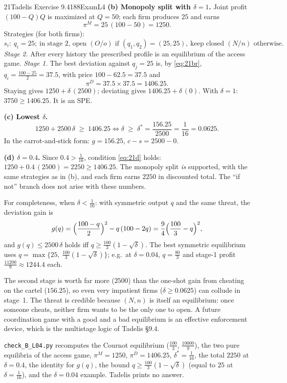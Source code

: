 \begin{exsol}{21}{Tadelis Exercise 9.4}{188}{Exam}{L4}
\textbf{(b) Monopoly split with $\delta = 1$.} Joint profit $(100 - Q)Q$ is maximized at $Q = 50$;
each firm produces $25$ and earns
\[
  \pi^M = 25\,(100 - 50) = 1250 .
\]
Strategies (for both firms):
\[
  s_i:\ q_i = 25;\ \text{in stage 2, open } (O / o) \text{ if } (q_1,q_2) = (25,25),\ \text{keep
  closed } (N / n) \text{ otherwise}.
\]
\emph{Stage 2.} After every history the prescribed profile is an equilibrium of the access game.
\emph{Stage 1.} The best deviation against $q_j = 25$ is, by \eqref{eq:21br},
$q_i = \frac{100 - 25}{2} = 37.5$, with price $100 - 62.5 = 37.5$ and
\[
  \pi^D = 37.5 \times 37.5 = 1406.25 .
\]
Staying gives $1250 + \delta\,(2500)$; deviating gives $1406.25 + \delta\,(0)$. With $\delta = 1$:
$3750 \ge 1406.25$. It is an SPE.

\textbf{(c) Lowest $\delta$.}
\begin{equation}
  1250 + 2500\,\delta \;\ge\; 1406.25 \iff \delta \;\ge\; \delta^* = \frac{156.25}{2500} = \frac{1}{16} = 0.0625 .
  \label{eq:21d}
\end{equation}
In the carrot-and-stick form: $g = 156.25$, $c - s = 2500 - 0$.

\textbf{(d) $\delta = 0.4$.} Since $0.4 > \frac1{16}$, condition \eqref{eq:21d} holds:
$1250 + 0.4\,(2500) = 2250 \ge 1406.25$. The monopoly split \emph{is} supported, with the same
strategies as in (b), and each firm earns $2250$ in discounted total. The ``if not'' branch does not
arise with these numbers.

For completeness, when $\delta < \frac1{16}$: with symmetric output $q$ and the same threat, the
deviation gain is
\[
  g(q) = \Bigl(\frac{100 - q}{2}\Bigr)^2 - q\,(100 - 2q) = \frac94\Bigl(\frac{100}{3} - q\Bigr)^2 ,
\]
and $g(q) \le 2500\,\delta$ holds iff $q \ge \frac{100}{3}(1 - \sqrt{\delta})$. The best symmetric
equilibrium uses $q = \max\{25,\ \frac{100}{3}(1 - \sqrt\delta)\}$; e.g.\ at $\delta = 0.04$,
$q = \frac{80}{3}$ and stage-1 profit $\frac{11200}{9} \approx 1244.4$ each.

\interp The second stage is worth far more ($2500$) than the one-shot gain from cheating on the
cartel ($156.25$), so even very impatient firms ($\delta \ge 0.0625$) can collude in stage~1. The
threat is credible because $(N,n)$ is itself an equilibrium: once someone cheats, neither firm
wants to be the only one to open. A future coordination game with a good and a bad equilibrium is
an effective enforcement device, which is the multistage logic of Tadelis \S9.4.

\verify \texttt{check\_B\_L04.py} recomputes the Cournot equilibrium ($\frac{100}{3}$,
$\frac{10000}{9}$), the two pure equilibria of the access game, $\pi^M = 1250$,
$\pi^D = 1406.25$, $\delta^* = \frac1{16}$, the total $2250$ at $\delta = 0.4$, the identity for
$g(q)$, the bound $q \ge \frac{100}{3}(1 - \sqrt\delta)$ (equal to $25$ at $\delta = \frac1{16}$),
and the $\delta = 0.04$ example. Tadelis prints no answer.


\end{exsol}
